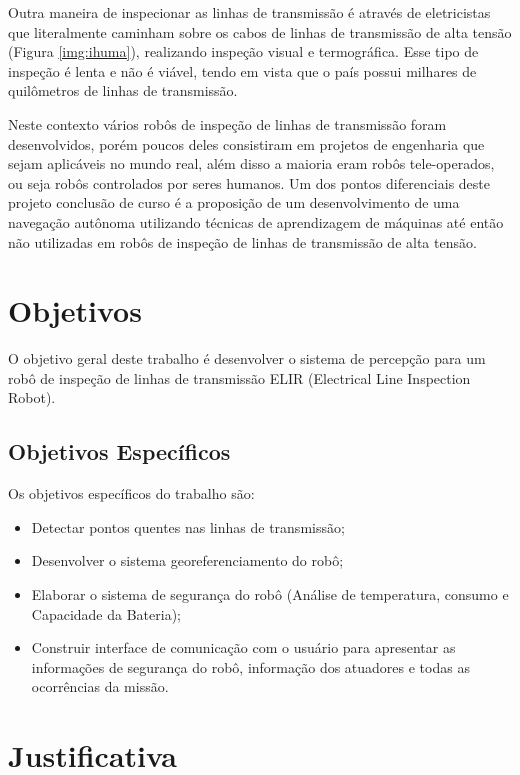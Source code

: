 Outra maneira de inspecionar as linhas de transmissão é através de eletricistas que literalmente caminham sobre os cabos de linhas de transmissão de alta tensão (Figura \ref{img:ihuma}), realizando inspeção visual e termográfica. Esse tipo de inspeção é lenta e não é viável, tendo em vista que o país possui milhares de quilômetros de linhas de transmissão.

Neste contexto vários robôs de inspeção de linhas de transmissão foram desenvolvidos, porém poucos deles consistiram em projetos de engenharia que sejam aplicáveis no mundo real, além disso a maioria eram robôs tele-operados, ou seja robôs controlados por seres humanos. Um dos pontos diferenciais deste projeto conclusão de curso é a proposição de um desenvolvimento de uma navegação autônoma utilizando técnicas de aprendizagem de máquinas até então não utilizadas em robôs de inspeção de linhas de transmissão de alta tensão.

\section{Objetivos}
\label{sec:obj}

O  objetivo geral deste  trabalho   é  desenvolver o sistema de percepção para um robô de inspeção de linhas de transmissão ELIR (Electrical Line Inspection Robot).


\subsection{Objetivos Específicos}
Os objetivos específicos do trabalho são:
\label{ssec:objesp}

\begin{itemize}
\item Detectar pontos quentes nas linhas de transmissão;
\item Desenvolver o sistema georeferenciamento do robô;
\item Elaborar o sistema de segurança do robô (Análise de temperatura, consumo e Capacidade da Bateria);
\item Construir interface de comunicação com o usuário para apresentar as informações de segurança do robô, informação dos atuadores e todas as ocorrências da missão.
\end{itemize}

\section{Justificativa}
\label{sec:justi}

